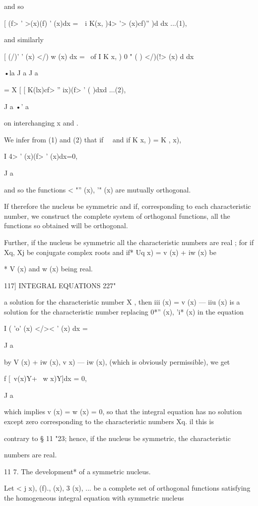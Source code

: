 {and so

[ (f> ' >(x)(f) ' (x)dx = \,\ i K(x, )4> '> (x)cf)'' )d dx ...(1),

and similarly

[ (/)' ' (x) </) w (x) dx = \ of I K x, ) 0 " ( ) </)(!> (x) d dx

•la J a J a

= X [ [ K(lx)cf> '' ix)(f> ' ( )dxd ...(2),

J a •' a

on interchanging x and .

We infer from (1) and (2) that if \ \ and if K x, ) = K , x),

I 4> ' (x)(f> ' (x)dx=0,

J a

and so the functions < "'' (x), '" (x) are mutually orthogonal.

If therefore the nucleus be symmetric and if, corresponding to each
characteristic number, we construct the complete system of orthogonal
functions, all the functions so obtained will be orthogonal.

Further, if the nucleus be symmetric all the characteristic numbers
are real ; for if Xq, Xj be conjugate complex roots and if* Uq x) = v
(x) + iw (x) be

* V (x) and w (x) being real.



117] INTEGRAL EQUATIONS 227"

a solution for the characteristic number X , then iii (x) = v (x) —
iiu (x) is a solution for the characteristic number \; replacing 0*''
(x), 'i* (x) in the equation

I ( 'o' (x) </>< ' (x) dx =

J a

by V (x) + iw (x), v x) — iw (x), (which is obviously permissible), we
get

f [\ v(x)Y+ \ w x)Y]dx = 0,

J a

which implies v (x) = w (x) = 0, so that the integral equation has no
solution except zero corresponding to the characteristic numbers Xq.
il this is

contrary to § 11 "23; hence, if the nucleus be symmetric, the
characteristic

numbers are real.

11 7. The development* of a symmetric nucleus.

Let < j x), (f)., (x), 3 (x), ... be a complete set of orthogonal
functions satisfying the homogeneous integral equation with symmetric
nucleus

}
